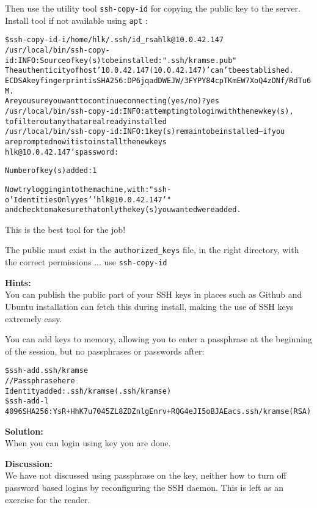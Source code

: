 \documentclass[a4paper,11pt,notitlepage]{report}
\begin{document}
Then use the utility tool \verb+ssh-copy-id+ for copying the public key to the server. Install tool if not available using \verb+apt+ :
\begin{alltt}\footnotesize
\$ ssh-copy-id -i /home/hlk/.ssh/id_rsa hlk@10.0.42.147
/usr/local/bin/ssh-copy-id: INFO: Source of key(s) to be installed: ".ssh/kramse.pub"
The authenticity of host '10.0.42.147 (10.0.42.147)' can't be established.
ECDSA key fingerprint is SHA256:DP6jqadDWEJW/3FYPY84cpTKmEW7XoQ4zDNf/RdTu6M.
Are you sure you want to continue connecting (yes/no)? yes
/usr/local/bin/ssh-copy-id: INFO: attempting to log in with the new key(s),
to filter out any that are already installed
/usr/local/bin/ssh-copy-id: INFO: 1 key(s) remain to be installed -- if you
are prompted now it is to install the new keys
hlk@10.0.42.147's password:

Number of key(s) added:        1

Now try logging into the machine, with:   "ssh -o 'IdentitiesOnly yes' 'hlk@10.0.42.147'"
and check to make sure that only the key(s) you wanted were added.
\end{alltt}

\vskip 5mm

\centerline{This is the best tool for the job!}

The public must exist in the \verb+authorized_keys+ file, in the right directory, with the correct permissions ... use \verb+ssh-copy-id+

{\bf Hints:}\\
You can publish the public part of your SSH keys in places such as Github and Ubuntu installation can fetch this during install, making the use of SSH keys extremely easy.

You can add keys to memory, allowing you to enter a passphrase at the beginning of the session, but no passphrases or passwords after:

\begin{alltt}\footnotesize
\$ ssh-add .ssh/kramse
// Passphrase here
Identity added: .ssh/kramse (.ssh/kramse)
\$ ssh-add -l
4096 SHA256:YsR+HhK7u7045ZL8ZDZnlgEnrv+RQG4eJI5oBJAEacs .ssh/kramse (RSA)
\end{alltt}


{\bf Solution:}\\
When you can login using key you are done.

{\bf Discussion:}\\
We have not discussed using passphrase on the key, neither how to turn off password based logins by reconfiguring the SSH daemon. This is left as an exercise for the reader.
\end{document}

